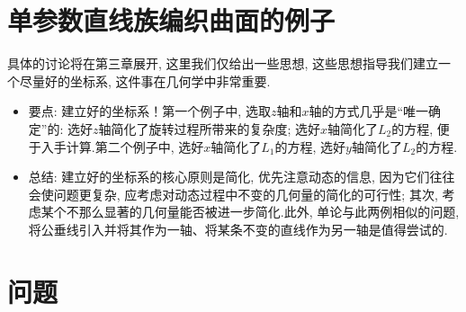 \documentclass[./main.tex]{subfiles}
\begin{document}
\section{单参数直线族编织曲面的例子}
具体的讨论将在第三章展开, 这里我们仅给出一些思想, 这些思想指导我们建立一个尽量好的坐标系, 这件事在几何学中非常重要.
\begin{itemize}
    \item 要点: 建立好的坐标系！第一个例子中, 选取$z$轴和$x$轴的方式几乎是``唯一确定''的: 选好$z$轴简化了旋转过程所带来的复杂度; 选好$x$轴简化了$L_2$的方程, 便于入手计算.第二个例子中, 选好$x$轴简化了$L_1$的方程, 选好$y$轴简化了$L_2$的方程.
    \item 总结: 建立好的坐标系的核心原则是简化, 优先注意动态的信息, 因为它们往往会使问题更复杂, 应考虑对动态过程中不变的几何量的简化的可行性; 其次, 考虑某个不那么显著的几何量能否被进一步简化.此外, 单论与此两例相似的问题, 将公垂线引入并将其作为一轴、将某条不变的直线作为另一轴是值得尝试的.
\end{itemize}


\section{问题}
\renewcommand{\labelenumi}{(\arabic{enumi})}
\end{document}
